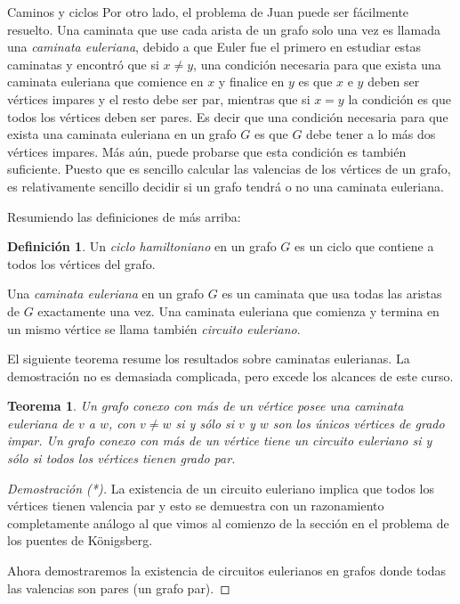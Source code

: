 \documentclass[11pt,spanish,makeidx]{amsbook}
\newtheorem{teorema}{Teorema}[section]
\theoremstyle{definition}
\newtheorem{definicion}{Definici\'on}[section]
\theoremstyle{remark}
\begin{document}
\begin{section}{Caminos y ciclos}
Por otro lado, el problema de Juan puede ser fácilmente resuelto. Una caminata que use cada arista de un grafo solo una vez es llamada una {\em caminata euleriana}, debido a que Euler  fue el primero en estudiar estas caminatas y encontró que si $x\not= y$, una condición necesaria para que exista una caminata euleriana que comience en $x$ y finalice en $y$ es que $x$ e $y$ deben ser vértices impares y el resto debe ser par, mientras que si $x=y$ la condición es que todos los vértices deben ser pares. Es decir que una condición necesaria para que exista una caminata euleriana en un grafo $G$ es que $G$ debe tener a lo más dos vértices impares. Más aún, puede probarse que esta condición es también suficiente. Puesto que es sencillo calcular las valencias de los vértices de un grafo, es relativamente sencillo decidir si un grafo tendrá o no una caminata euleriana. 

Resumiendo las definiciones de más arriba:

\begin{definicion}
Un {\em ciclo hamiltoniano} en un grafo $G$ es un ciclo que contiene a todos los vértices del grafo.

Una {\em caminata euleriana} en un grafo $G$ es un caminata que usa todas las aristas de $G$ exactamente una vez. Una caminata euleriana que comienza y termina en un mismo vértice se llama también {\em circuito euleriano}.
\end{definicion}

El siguiente teorema resume los resultados sobre caminatas eulerianas. La demostración no es demasiada complicada, pero excede los alcances de este curso.  

\begin{teorema}\label{teo-caminata-euleriana} Un grafo conexo con más de un vértice posee una caminata euleriana de $v$ a $w$, con $v \not= w$ si y sólo si $v$ y $w$ son los únicos vértices de grado impar. Un grafo conexo con más de un vértice tiene un circuito euleriano si y sólo si todos los vértices tienen grado par.
\end{teorema}
\begin{proof}[Demostración (*)]
	La existencia de un circuito euleriano implica que todos los vértices tienen valencia par y esto se demuestra con un razonamiento completamente análogo al que vimos al comienzo de la sección en el problema de los puentes de Königsberg. 
	
	
	Ahora demostraremos la existencia de circuitos eulerianos en grafos donde todas las valencias son pares (un grafo par). 
	

\end{proof}
\end{section}
\end{document}
